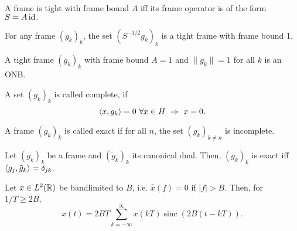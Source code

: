 \begin{boxtheorem}
    A frame is tight with frame bound $A$ iff its frame operator is of the
    form $S=A\operatorname*{id}.$
\end{boxtheorem}

\begin{boxtheorem}
    For any frame $(g_k)_k$, the set $(S^{-1/2}g_k)_k$ 
    is a tight frame with frame bound 1.
\end{boxtheorem}

\begin{boxtheorem}
    A tight frame $(g_k)_k$ with frame bound $A=1$ and $\|g_k\|=1$
    for all $k$ is an ONB.
\end{boxtheorem}

\begin{boxdefinition}
    A set $(g_k)_k$ is called complete, if 
    $$\la x,g_k\ra =0 \ \forall x\in H \ \imp \ x=0.$$
\end{boxdefinition}

\begin{boxdefinition}
    A frame $(g_k)_k$ is called exact if for all $n$, the set 
    $(g_k)_{k\neq n}$ is incomplete.
\end{boxdefinition}

\begin{boxtheorem} [Exactness]
    Let $(g_k)_k$ be a frame and $(\tilde g_k)_k$ its canonical dual. Then,
    $(g_k)_k$ is exact iff $\langle g_j,\tilde g_k\rangle=\delta_{jk}.$ 
\end{boxtheorem}

\begin{boxtheorem}
    Let $x\in L^2(\mathbb{R})$ be bandlimited to $B$, i.e. $\hat x(f)=0$ if 
    $|f|> B$. Then, for $1/T\geq2B$, 
    $$x(t)=2BT\sum_{k=-\infty}^\infty x(kT)\operatorname{sinc}(2B(t-kT)).$$
\end{boxtheorem}
